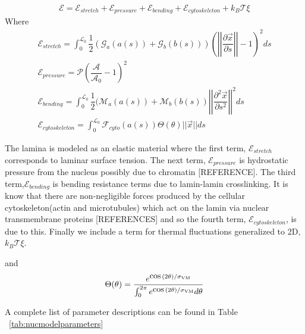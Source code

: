 \begin{align}
\mathcal{E} = \mathcal{E}_{stretch} + \mathcal{E}_{pressure} +\mathcal{E}_{bending} + \mathcal{E}_{cytoskeleton} + k_B\mathcal{T} \xi
\end{align}
Where 
\begin{align}
\mathcal{E}_{stretch} = \displaystyle \int_0^{\mathcal{L}_0} \dfrac{1}{2} (\mathcal{G}_a(a(s)) +\mathcal{G}_b(b(s)) )\left( \left |\left| \dfrac{\partial \vec{x} }{\partial s} \right|\right| - 1\right)^2 ds \\
\mathcal{E}_{pressure}  = \mathcal{P} \left( \dfrac{\mathcal{A}}{\mathcal{A}_0} -1\right)^2  \\
\mathcal{E}_{bending} = \displaystyle\int_0^{\mathcal{L}_0} \dfrac{1}{2 } (\mathcal{M}_a(a(s)) + \mathcal{M}_b (b(s)) \left|\left| \dfrac{\partial^2 \vec{x}}{\partial s^2} \right|\right|^2 ds\\
\mathcal{E}_{cytoskeleton} = \displaystyle\int_0^{\mathcal{L}_0} \mathcal{F}_{cyto} (a(s))\Theta (\theta) || \vec{x} || ds 
\end{align}

The lamina is modeled as an elastic material where the first term, $\mathcal{E}_{stretch}$ corresponds to laminar surface tension. The next term, $\mathcal{E}_{pressure}$ is hydrostatic pressure from the nucleus possibly due to chromatin [REFERENCE]. The third term,$\mathcal{E}_{bending}$  is bending resistance terms due to lamin-lamin crosslinking. It is know that there are non-negligible forces produced by the cellular cytoskeleton(actin and microtubules) which act on the lamin via nuclear transmembrane proteins [REFERENCES] and so the fourth term, $\mathcal{E}_{cytoskeleton}$, is due to this. Finally we include a term for thermal fluctuations generalized to 2D, $k_B\mathcal{T} \xi$. 



and \[ \Theta (\theta) = \dfrac{e^{\cos(2\theta)/\sigma_{\rm VM }}}{\int_0^{ 2\pi} e^{\cos(2\theta)/\sigma_{\rm VM}}d \theta} \]


A complete list of parameter descriptions can be found in Table ~\ref{tab:nucmodelparameters}

